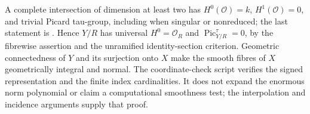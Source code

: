 A complete intersection of dimension at least two has
$H^0(\mathcal O)=k$, $H^1(\mathcal O)=0$, and trivial Picard tau-group,
including when singular or nonreduced; the last statement is
\cite[Theorem~1.1.8(iii), proved in \S3.4]{BCECotnerZavyalov2024}.
Hence $Y/R$ has universal $H^0=\mathcal O_R$ and
$\operatorname{Pic}^\tau_{Y/R}=0$, by the fibrewise assertion and the
unramified identity-section criterion. Geometric connectedness of $Y$
and its surjection onto $X$ make the smooth fibres of $X$ geometrically
integral and normal. The coordinate-check script verifies the signed
representation and the finite index cardinalities. It does not expand
the enormous norm polynomial or claim a computational smoothness test;
the interpolation and incidence arguments supply that proof.

